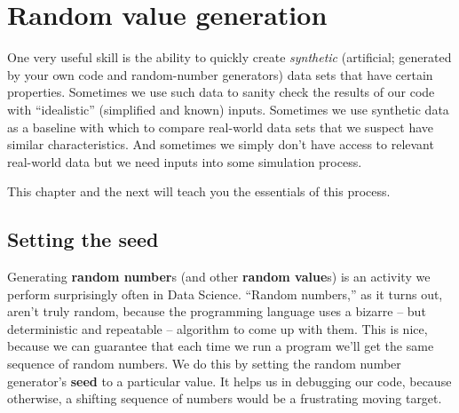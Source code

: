 
\chapter{Random value generation}
\label{ch:random}



One very useful skill is the ability to quickly create \textit{synthetic}
(artificial; generated by your own code and random-number generators) data
sets that have certain properties. Sometimes we use such data to sanity check
the results of our code with ``idealistic'' (simplified and known) inputs.
Sometimes we use synthetic data as a baseline with which to compare real-world
data sets that we suspect have similar characteristics. And sometimes we
simply don't have access to relevant real-world data but we need inputs into
some simulation process.

This chapter and the next will teach you the essentials of this process.


\section{Setting the seed}

Generating \textbf{random number}s (and other \textbf{random value}s) is an
activity we perform surprisingly often in Data Science. ``Random numbers,'' as
it turns out, aren't truly random, because the programming language uses a
bizarre -- but deterministic and repeatable -- algorithm to come up with them.
This is nice, because we can guarantee that each time we run a program we'll
get the same sequence of random numbers. We do this by setting the random
number generator's \textbf{seed} to a particular value. It helps us in
debugging our code, because otherwise, a shifting sequence of numbers would be
a frustrating moving target. 

